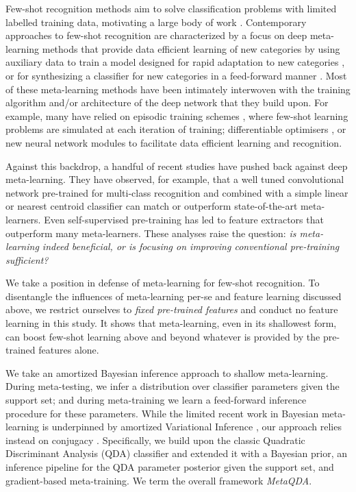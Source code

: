 \documentclass[10pt,twocolumn,letterpaper]{article}
\begin{document}
Few-shot recognition methods aim to solve classification problems with limited labelled training data, motivating a large body of work \cite{wang2019fewShotSurvey}. Contemporary approaches to few-shot recognition are characterized by a focus on deep meta-learning \cite{hospedales2020metaSurvey} methods that provide data efficient learning of new categories by using auxiliary data to train a model designed for rapid adaptation to new categories \cite{finn2017model,zintgraf2018cavia}, or for synthesizing a classifier for new categories in a feed-forward manner \cite{mishra2018simple, qiao2017few}. Most of these meta-learning methods have been intimately interwoven with the training algorithm and/or architecture of the deep network that they build upon. For example, many have relied on episodic training schemes \cite{snell2017prototypical,vinyals2016matching}, where few-shot learning problems are simulated at each iteration of training; differentiable optimisers \cite{bertinetto2019R2D2,lee2019meta}, or new neural network modules \cite{sung2018learning,gordon2019metaPred} to facilitate data efficient learning and recognition.  

Against this backdrop, a handful of recent studies \cite{wang2019simpleshot,goldblum2020unraveling,chen2019closerfewshot,mangla2020charting,yin2020metaMemorisation,wang2020comparison} have pushed back against deep meta-learning. They have observed, for example, that a well tuned convolutional network pre-trained for multi-class recognition and combined with a simple linear or nearest centroid classifier can match or outperform state-of-the-art meta-learners. Even self-supervised pre-training \cite{mangla2020charting} has led to feature extractors that outperform many meta-learners. These analyses raise the question: \emph{is meta-learning indeed beneficial, or is focusing on improving conventional pre-training sufficient?}

We take a position in defense of meta-learning for few-shot recognition. To disentangle the influences of meta-learning per-se and feature learning discussed above, we restrict ourselves to \emph{fixed pre-trained features} and conduct no feature learning in this study. It shows that meta-learning, even in its shallowest form, can boost few-shot learning above and beyond whatever is provided by the pre-trained features alone. 

We take an amortized Bayesian inference approach \cite{gordon2019metaPred,heskes2000empirical} to shallow meta-learning. During meta-testing, we infer a distribution over classifier parameters given the support set; and during meta-training we learn a feed-forward inference procedure for these parameters. While the limited recent work in Bayesian meta-learning is underpinned by amortized Variational Inference \cite{gordon2019metaPred}, our approach relies instead on conjugacy \cite{gelman2003bda}. Specifically, we build upon the classic Quadratic Discriminant Analysis (QDA) \cite{friedman2001elements} classifier and extended it with a Bayesian prior, an inference pipeline for the QDA parameter posterior given the support set, and  gradient-based meta-training. We term the overall framework \textit{MetaQDA}. 
\end{document}
